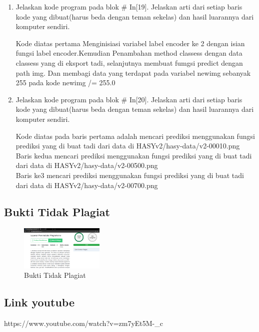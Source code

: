 \begin{enumerate}
\item Jelaskan kode program pada blok \# In[19]. Jelaskan arti dari setiap baris
kode yang dibuat(harus beda dengan teman sekelas) dan hasil luarannya dari
komputer sendiri.

	\hfill\break
	

Kode diatas pertama Menginisiasi variabel label encoder ke 2 dengan isian fungsi label encoder.Kemudian Penambahan method classess dengan data classess yang di eksport tadi, selanjutnya  membuat fumgsi predict dengan path img. Dan membagi data yang terdapat pada variabel newimg sebanyak 255 pada kode newimg /= 255.0

\item Jelaskan kode program pada blok \# In[20]. Jelaskan arti dari setiap baris
kode yang dibuat(harus beda dengan teman sekelas) dan hasil luarannya dari
komputer sendiri.

	\hfill\break
	

Kode diatas pada baris pertama adalah mencari prediksi menggunakan fungsi prediksi yang di buat tadi dari data di HASYv2/hasy-data/v2-00010.png\\
Baris kedua mencari prediksi menggunakan fungsi prediksi yang di buat tadi dari data di HASYv2/hasy-data/v2-00500.png\\
Baris ke3 mencari prediksi menggunakan fungsi prediksi yang di buat tadi dari data di HASYv2/hasy-data/v2-00700.png
\end{enumerate}

\subsection{Bukti Tidak Plagiat}
\begin{figure}
	\includegraphics[width=4cm]{figures/1174062/8/noplagiat.png}
	\centering
	\caption{Bukti Tidak Plagiat}
\end{figure}

\subsection{Link youtube}
https://www.youtube.com/watch?v=zm7yEt5M-_c

